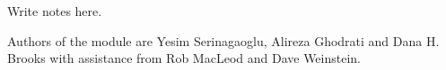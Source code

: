 
\ModuleRefNotes

Write notes here.


\ModuleRefCredits

Authors of the  module are Yesim Serinagaoglu, Alireza
Ghodrati and Dana H. Brooks with assistance from Rob MacLeod and Dave
Weinstein.
